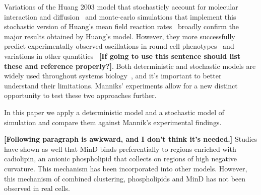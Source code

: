 \documentclass[letterpaper,twocolumn,amsmath,amssymb,pre]{revtex4-1}
\newcommand{\red}[1]{{\bf \color{red} #1}}
\newcommand{\fixme}[1]{\red{[#1]}}
\begin{document}
Variations of the Huang 2003 model that stochasticly account for
molecular interaction and diffusion~\cite{fange2006noise} and
monte-carlo simulations that implement this stochastic version of
Huang's mean field reaction rates~\cite{kerr2006division} broadly
confirm the major results obtained by Huang's model.  However, they
more successfully predict experimentally observed oscillations in
round cell phenotypes~\cite{fange2006noise, huang2004min} and
variations in other
quantities~\cite{kruse2007experimentalist}\fixme{If going to use this
  sentence should list these and reference properly?}. Both
deterministic and stochastic models are widely used throughout systems
biology~\cite{lawson2013spatial,robb2014stochastic,oguz2014stochastic,fu2013deterministic,rudiger2014stochastic},
and it's important to better understand their limitations.  Manniks'
experiments allow for a new distinct opportunity to test these two
approaches further.


In this paper we apply a deterministic model and a stochastic model
of simulation and compare them against Mannik's experimental findings.


\fixme{Following paragraph is awkward, and I don't think it's needed.}
Studies have shown as well that MinD binds preferentially to regions
enriched with cadiolipin, an anionic phospholipid that collects on
regions of high negative curvature. This mechanism has been
incorporated into other
models.\cite{drew2005polymerization,cytrynbaum2007multistranded,renner2012mind,renner2012mind}
However, this mechanism of combined clustering, phospholipids and MinD
has not been observed in real cells. \cite{halatek2012highly}
\end{document}
